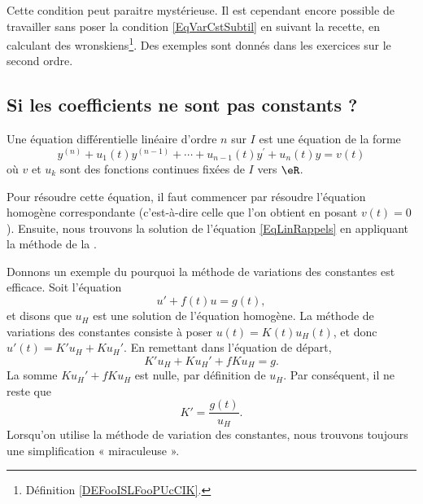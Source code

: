Cette condition peut paraitre mystérieuse. Il est cependant encore possible de travailler sans poser la condition \eqref{EqVarCstSubtil} en suivant la recette, en calculant des wronskiens\footnote{Définition \ref{DEFooISLFooPUcCIK}.}. Des exemples sont donnés dans les exercices sur le second ordre.

\subsection{Si les coefficients ne sont pas constants ?}

Une équation différentielle linéaire d'ordre \( n\) sur \( I\) est une équation de la forme
\begin{equation}	\label{EqLinRappels}
	y^{(n)} + u_1(t) y^{(n-1)} + \cdots + u_{n-1}(t) y^\prime + u_n(t) y = v(t)
\end{equation}
où \( v\) et \( u_k\) sont des fonctions continues fixées de \( I\) vers \( \eR\).

Pour résoudre cette équation, il faut commencer par résoudre l'équation homogène correspondante (c'est-à-dire celle que l'on obtient en posant \( v(t)=0\)). Ensuite, nous trouvons la solution de l'équation \eqref{EqLinRappels} en appliquant la méthode de la .

Donnons un exemple du pourquoi la méthode de variations des constantes est efficace. Soit l'équation
\begin{equation}		\label{EqDiffExempleVarCst}
	u'+f(t)u=g(t),
\end{equation}
et disons que \( u_H\) est une solution de l'équation homogène. La méthode de variations des constantes consiste à poser \( u(t)=K(t)u_H(t)\), et donc \( u'(t)=K'u_H+Ku_H'\). En remettant dans l'équation de départ,
\begin{equation}
	K'u_H+Ku_H'+fKu_H=g.
\end{equation}
La somme \( Ku_H'+fKu_H\) est nulle, par définition de \( u_H\). Par conséquent, il ne reste que
\begin{equation}
	K'=\frac{ g(t) }{ u_H }.
\end{equation}
Lorsqu'on utilise la méthode de variation des constantes, nous trouvons toujours une simplification « miraculeuse ».

